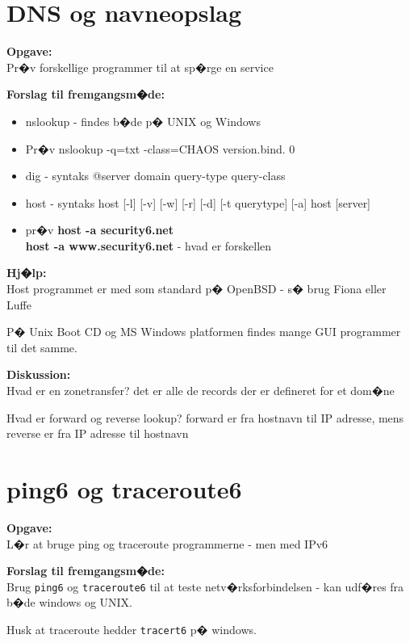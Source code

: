 \documentclass[a4paper,11pt,notitlepage]{oevelser}
\begin{document}
\chapter{DNS og navneopslag}
\label{ex:basic-dns-lookup}

{\bfseries Opgave:}\\
Pr�v forskellige programmer til at sp�rge en service

{\bfseries Forslag til fremgangsm�de:}\\
\begin{itemize}
\item nslookup - findes b�de p� UNIX og Windows
\item Pr�v nslookup -q=txt -class=CHAOS version.bind. 0
\item dig - syntaks @server domain query-type query-class
\item host - syntaks host [-l] [-v] [-w] [-r] [-d] [-t querytype] [-a] host [server]
\item pr�v {\bfseries host -a security6.net} \\
{\bfseries host -a www.security6.net} - hvad er forskellen
\end{itemize}

{\bfseries Hj�lp:}\\
Host programmet er med som standard p� OpenBSD - s� brug Fiona eller Luffe

P� Unix Boot CD og MS Windows platformen findes mange GUI programmer til det samme.

{\bfseries Diskussion:}\\
Hvad er en zonetransfer? det er alle de records der er defineret for
et dom�ne

Hvad er forward og reverse lookup? forward er fra hostnavn til IP adresse,
mens reverse er fra IP adresse til hostnavn




\chapter{ping6 og traceroute6}
\label{ex:ping6}

{\bfseries Opgave:}\\
L�r at bruge ping og traceroute programmerne - men med IPv6

{\bfseries Forslag til fremgangsm�de:} \\
Brug \verb+ping6+ og \verb+traceroute6+ til at teste netv�rksforbindelsen - kan
udf�res fra b�de windows og UNIX.

Husk at traceroute hedder \verb+tracert6+ p� windows.
\end{document}
